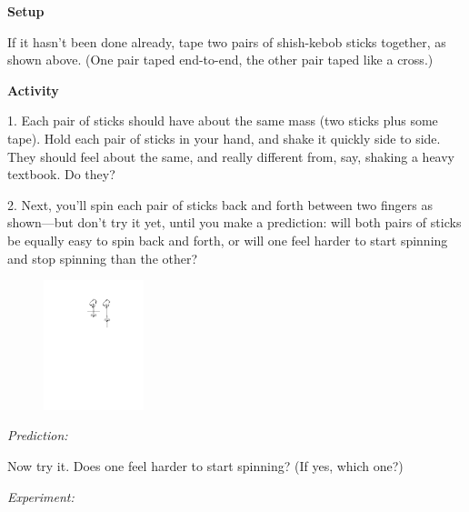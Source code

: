 \bigskip
\textbf{Setup}

If it hasn't been done already, tape two pairs of shish-kebob sticks together, as shown above.  (One pair taped end-to-end, the other pair taped like a cross.)

\bigskip
\textbf{Activity}

1.  Each pair of sticks should have about the same mass (two sticks plus some tape).  Hold each pair of sticks in your hand, and shake it quickly side to side.  They should feel about the same, and really different from, say, shaking a heavy textbook.  Do they?
\answerspace{0.2in}


2.  Next, you'll spin each pair of sticks back and forth between two fingers as shown---but don't try it yet, until you make a prediction: will both pairs of sticks be equally easy to spin back and forth, or will one feel harder to start spinning and stop spinning than the other?

\begin{figure}
    \vspace{-0.40in}
    \includegraphics[width=0.26\textwidth]{moment_inertia_feel/stick_pics2.pdf}
\end{figure}

\phantom{indent05}
\textit{Prediction:}
\answerspace{0.2in}

Now try it.  Does one feel harder to start spinning?  (If yes, which one?)

\phantom{indent05}\textit{Experiment:}
\answerspace{0.2in}

